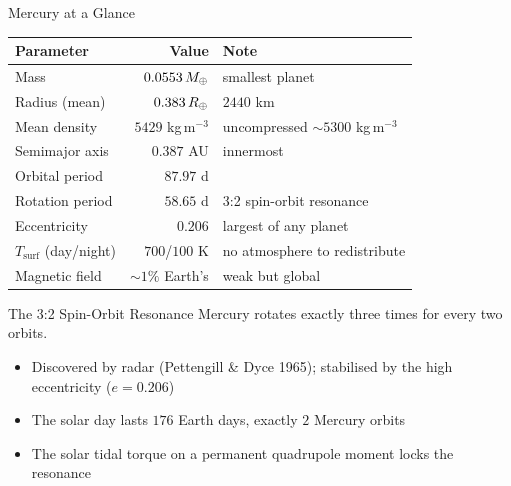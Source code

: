 \documentclass[aspectratio=169, 11pt]{beamer}
\begin{document}
\begin{frame}{Mercury at a Glance}
  \centering
  \small
  \begin{tabular}{l r l}
    \toprule
    \textbf{Parameter} & \textbf{Value} & \textbf{Note} \\
    \midrule
    Mass & $0.0553\,M_{\oplus}$ & smallest planet \\
    Radius (mean) & $0.383\,R_{\oplus}$ & $2440$ km \\
    Mean density & $5429$ kg\,m$^{-3}$ & uncompressed $\sim 5300$ kg\,m$^{-3}$ \\
    Semimajor axis & $0.387$ AU & innermost \\
    Orbital period & $87.97$ d & \\
    Rotation period & $58.65$ d & 3:2 spin-orbit resonance \\
    Eccentricity & $0.206$ & largest of any planet \\
    $T_{\mathrm{surf}}$ (day/night) & $700$/$100$ K & no atmosphere to redistribute \\
    Magnetic field & $\sim 1\%$ Earth's & weak but global \\
    \bottomrule
  \end{tabular}
  \vskip6pt
\end{frame}

\begin{frame}
\end{frame}

\begin{frame}{The 3:2 Spin-Orbit Resonance}
  Mercury rotates exactly three times for every two orbits.
  \vskip8pt
  \begin{itemize}
    \item Discovered by radar (Pettengill \& Dyce 1965); stabilised by the high eccentricity ($e = 0.206$)
    \item The solar day lasts $176$ Earth days, exactly $2$ Mercury orbits
    \item The solar tidal torque on a permanent quadrupole moment locks the resonance
  \end{itemize}
\end{frame}
\end{document}
